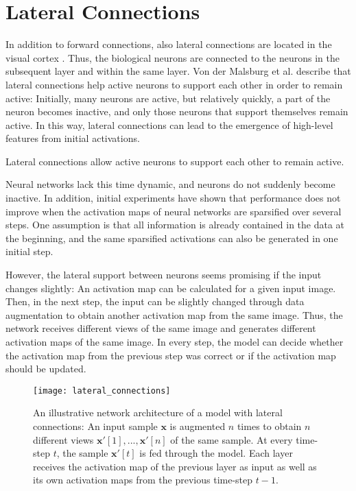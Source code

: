 \section{Lateral Connections}
In addition to forward connections, also lateral connections are located in the visual cortex .
Thus, the biological neurons are connected to the neurons in the subsequent layer and within the same layer.
Von der Malsburg et al.  describe that lateral connections help active neurons to support each other in order to remain active:
Initially, many neurons are active, but relatively quickly, a part of the neuron becomes inactive, and only those neurons that support themselves remain active. In this way, lateral connections can lead to the emergence of high-level features from initial activations.

\begin{claim}
	Lateral connections allow active neurons to support each other to remain active.
\end{claim}

Neural networks lack this time dynamic, and neurons do not suddenly become inactive. 
In addition, initial experiments have shown that performance does not improve when the activation maps of neural networks are sparsified over several steps.
One assumption is that all information is already contained in the data at the beginning, and the same sparsified activations can also be generated in one initial step.

However, the lateral support between neurons seems promising if the input changes slightly:
An activation map can be calculated for a given input image. Then, in the next step, the input can be slightly changed through data augmentation to obtain another activation map from the same image. Thus, the network receives different views of the same image and generates different activation maps of the same image. In every step, the model can decide whether the activation map from the previous step was correct or if the activation map should be updated.

\begin{figure}[h]
    \centering
    \texttt{[image: lateral\_connections]}
    \caption[Illustrative network architecture of a model with lateral connections]{An illustrative network architecture of a model with lateral connections: An input sample $\boldsymbol{x}$ is augmented $n$ times to obtain $n$ different views $\boldsymbol{x}'[1], ..., \boldsymbol{x}'[n]$ of the same sample. At every time-step $t$, the sample $\boldsymbol{x}'[t]$ is fed through the model. Each layer receives the activation map of the previous layer as input as well as its own activation maps from the previous time-step $t-1$.}
\end{figure}

